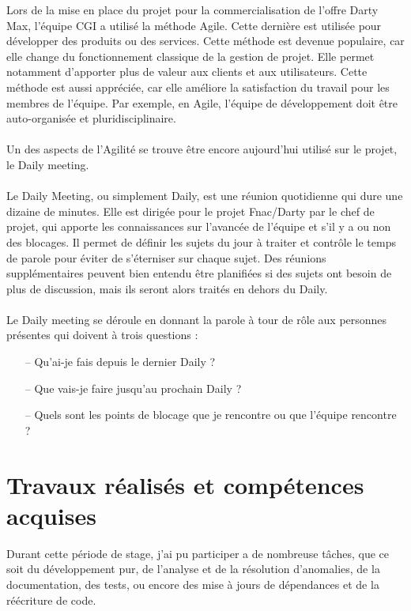 \documentclass[12pt, a4paper]{report}
\begin{document}
	Lors de la mise en place du projet pour la commercialisation de l'offre Darty Max, l'équipe CGI a utilisé la méthode Agile. Cette dernière est utilisée pour développer des produits ou des services. Cette méthode est devenue populaire, car elle change du fonctionnement classique de la gestion de projet. Elle permet notamment d'apporter plus de valeur aux clients et aux utilisateurs. Cette méthode est aussi appréciée, car elle améliore la satisfaction du travail pour les membres de l'équipe. Par exemple, en Agile, l'équipe de développement doit être auto-organisée et pluridisciplinaire.
	\\\\
	Un des aspects de l'Agilité se trouve être encore aujourd'hui utilisé sur le projet, le Daily meeting.
	\\\\
	Le Daily Meeting, ou simplement Daily, est une réunion quotidienne qui dure une dizaine de minutes. Elle est dirigée pour le projet Fnac/Darty par le chef de projet, qui apporte les connaissances sur l'avancée de l'équipe et s'il y a ou non des blocages. Il permet de définir les sujets du jour à traiter et contrôle le temps de parole pour éviter de s'éterniser sur chaque sujet. Des réunions supplémentaires peuvent bien entendu être planifiées si des sujets ont besoin de plus de discussion, mais ils seront alors traités en dehors du Daily.
	\\\\
	Le Daily meeting se déroule en donnant la parole à tour de rôle aux personnes présentes qui doivent à trois questions :
	\\
	\begin{itemize}
		\item[–] Qu'ai-je fais depuis le dernier Daily ?
		\item[–] Que vais-je faire jusqu'au prochain Daily ?
		\item[–] Quels sont les points de blocage que je rencontre ou que l'équipe rencontre ?\\  
	\end{itemize}

	\newpage
	\section{Travaux réalisés et compétences acquises}

	Durant cette période de stage, j'ai pu participer a de nombreuse tâches, que ce soit du développement pur, de l'analyse et de la résolution d'anomalies, de la documentation, des tests, ou encore des mise à jours de dépendances et de la réécriture de code.
\end{document}
